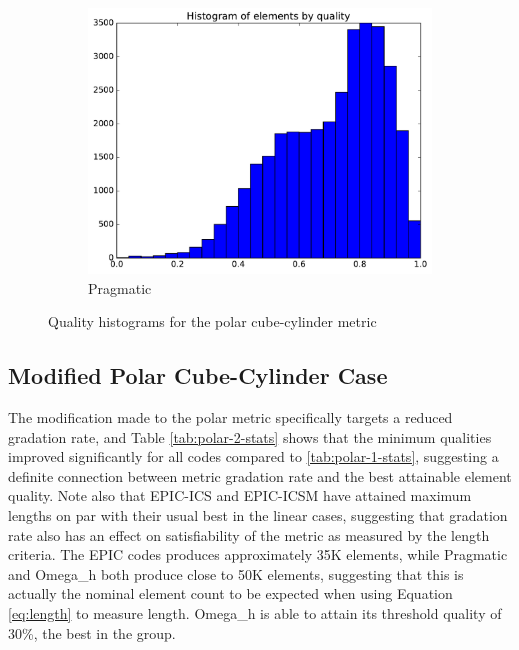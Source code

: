 \documentclass[3p,times,procedia,number]{elsarticle}
\begin{document}
\begin{figure}
\begin{subfigure}{.4\textwidth}
\includegraphics[width=\textwidth]{pragmatic-cube-cylinder-polar-1-quality.pdf}
\caption{Pragmatic}
\end{subfigure}
\caption{Quality histograms for the polar cube-cylinder metric}
\label{fig:cube-cylinder-polar-1-qualities}
\end{figure}

\subsection{Modified Polar Cube-Cylinder Case}

The modification made to the polar metric specifically targets
a reduced gradation rate, and Table \ref{tab:polar-2-stats}
shows that the minimum qualities improved significantly for all
codes compared to \ref{tab:polar-1-stats}, suggesting a definite
connection between metric gradation rate and the best attainable
element quality.
Note also that EPIC-ICS and EPIC-ICSM have attained maximum lengths
on par with their usual best in the linear cases, suggesting that
gradation rate also has an effect on satisfiability of the metric
as measured by the length criteria.
The EPIC codes produces approximately 35K elements, while
Pragmatic and Omega\_h both produce close to 50K elements,
suggesting that this is actually the nominal element count
to be expected when using Equation \ref{eq:length} to measure length.
Omega\_h is able to attain its threshold quality of 30\%, the best in the group.
\end{document}
